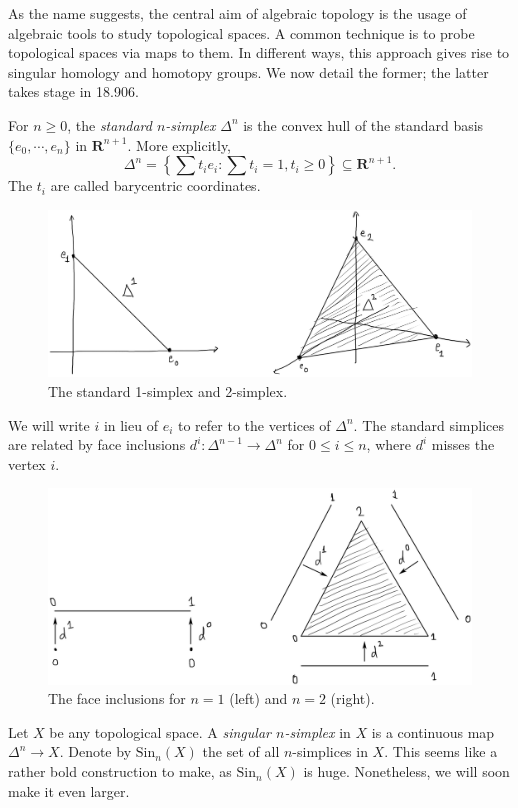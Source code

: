 As the name suggests, the central aim of algebraic topology is the usage of algebraic tools to study topological spaces. A common technique is to probe topological spaces via maps to them. In different ways, this approach gives rise to singular homology and homotopy groups. We now detail the former; the latter takes stage in 18.906.
\begin{definition}
For $n\geq 0$, the \emph{standard $n$-simplex} $\Delta^n$ is the convex hull of the standard basis $\{e_0,\cdots,e_n\}$ in $\mathbf{R}^{n+1}$. More explicitly,
$$\Delta^n = \left\{\sum t_i e_i : \sum t_i = 1, t_i\geq 0\right\}\subseteq\mathbf{R}^{n+1}.$$
The $t_i$ are called barycentric coordinates.
\end{definition}
\begin{figure}[H]
	\centering
	\includegraphics[width=0.9\linewidth]{assets/L01/01-standard-simplices}
	\caption{The standard 1-simplex and 2-simplex.}
	\label{fig:01-standard-simplices}
\end{figure}
We will write $i$ in lieu of $e_i$ to refer to the vertices of $\Delta^n$. The standard simplices are related by face inclusions $d^i\colon \Delta^{n-1} \to \Delta^{n}$ for $0\leq i \leq n$, where $d^i$ misses the vertex $i$.
\begin{figure}[H]
	\centering
	\includegraphics[width=0.9\linewidth]{assets/L01/01-face-inclusions}
	\caption{The face inclusions for $n=1$ (left) and $n=2$ (right).}
	\label{fig:01-face-inclusions}
\end{figure}
\begin{definition}
Let $X$ be any topological space. A \emph{singular $n$-simplex} in $X$ is a continuous map $\Delta^n\to X$. Denote by $\mathrm{Sin}_n(X)$ the set of all $n$-simplices in $X$. This seems like a rather bold construction to make, as $\mathrm{Sin}_n(X)$ is huge. Nonetheless, we will soon make it even larger.
\end{definition}
